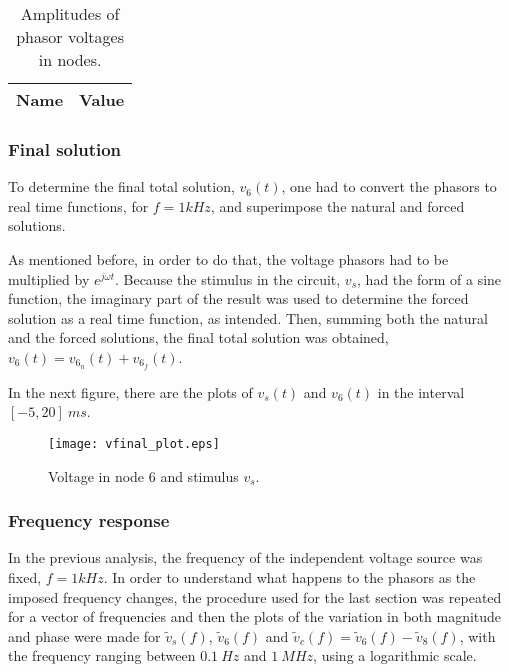 



\begin{table}[H]
  \centering
  \begin{tabular}{|c|c|}
    \hline    
    {\bf Name} & {\bf Value} \\ \hline
    
  \end{tabular}
  \caption{Amplitudes of phasor voltages in nodes.}
  \label{tab:forced_amp}
\end{table}


\subsubsection{Final solution}  %
To determine the final total solution, $v_6(t)$, one had to convert the phasors to real time functions, for $f=1kHz$, and superimpose the natural and forced solutions.
\par
As mentioned before, in order to do that, the voltage phasors had to be multiplied by $e^{j \omega t}$. Because the stimulus in the circuit, $v_s$, had the form of a sine function, the imaginary part of the result was used to determine the forced solution as a real time function, as intended.
Then, summing both the natural and the forced solutions, the final total solution was obtained, $v_6(t) = v_{6_n} (t) + v_{6_f} (t)$.
\par
In the next figure, there are the plots of $v_s(t)$ and $v_6(t)$ in the interval $[-5, 20] \ ms$.

\begin{figure}[H] \centering
\texttt{[image: vfinal\_plot.eps]}
\caption{Voltage in node 6 and stimulus $v_s$.}
\label{fig:final}
\end{figure}

\subsubsection{Frequency response}  %
\label{sec:frequency}

In the previous analysis, the frequency of the independent voltage source was fixed, $f=1kHz$. In order to understand what happens to the phasors as the imposed frequency changes, the procedure used for the last section was repeated for a vector of frequencies and then the plots of the variation in both magnitude and phase were made for $\tilde{v}_s(f)$, $\tilde{v}_6(f)$ and $\tilde{v}_c(f) = \tilde{v}_6(f)-\tilde{v}_8(f)$, with the frequency ranging between $0.1 \ Hz$ and $1 \ MHz$, using a logarithmic scale.

